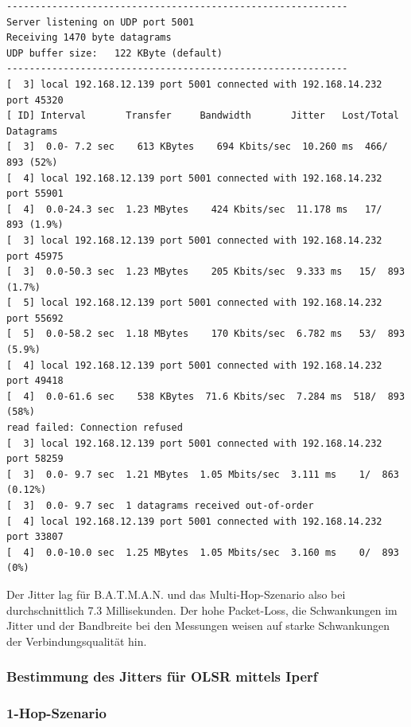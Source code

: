 \documentclass[a4paper,10pt]{article}
\begin{document}
\begin{lstlisting}
------------------------------------------------------------
Server listening on UDP port 5001
Receiving 1470 byte datagrams
UDP buffer size:   122 KByte (default)
------------------------------------------------------------
[  3] local 192.168.12.139 port 5001 connected with 192.168.14.232 port 45320
[ ID] Interval       Transfer     Bandwidth       Jitter   Lost/Total Datagrams
[  3]  0.0- 7.2 sec    613 KBytes    694 Kbits/sec  10.260 ms  466/  893 (52%)
[  4] local 192.168.12.139 port 5001 connected with 192.168.14.232 port 55901
[  4]  0.0-24.3 sec  1.23 MBytes    424 Kbits/sec  11.178 ms   17/  893 (1.9%)
[  3] local 192.168.12.139 port 5001 connected with 192.168.14.232 port 45975
[  3]  0.0-50.3 sec  1.23 MBytes    205 Kbits/sec  9.333 ms   15/  893 (1.7%)
[  5] local 192.168.12.139 port 5001 connected with 192.168.14.232 port 55692
[  5]  0.0-58.2 sec  1.18 MBytes    170 Kbits/sec  6.782 ms   53/  893 (5.9%)
[  4] local 192.168.12.139 port 5001 connected with 192.168.14.232 port 49418
[  4]  0.0-61.6 sec    538 KBytes  71.6 Kbits/sec  7.284 ms  518/  893 (58%)
read failed: Connection refused
[  3] local 192.168.12.139 port 5001 connected with 192.168.14.232 port 58259
[  3]  0.0- 9.7 sec  1.21 MBytes  1.05 Mbits/sec  3.111 ms    1/  863 (0.12%)
[  3]  0.0- 9.7 sec  1 datagrams received out-of-order
[  4] local 192.168.12.139 port 5001 connected with 192.168.14.232 port 33807
[  4]  0.0-10.0 sec  1.25 MBytes  1.05 Mbits/sec  3.160 ms    0/  893 (0%)
\end{lstlisting}

Der Jitter lag für B.A.T.M.A.N. und das Multi-Hop-Szenario also bei durchschnittlich 7.3 Millisekunden.
Der hohe Packet-Loss, die Schwankungen im Jitter und der Bandbreite bei den Messungen weisen auf starke Schwankungen der Verbindungsqualität hin.

\subsubsection{Bestimmung des Jitters für OLSR mittels Iperf}

\subsubsection*{1-Hop-Szenario}
\end{document}
